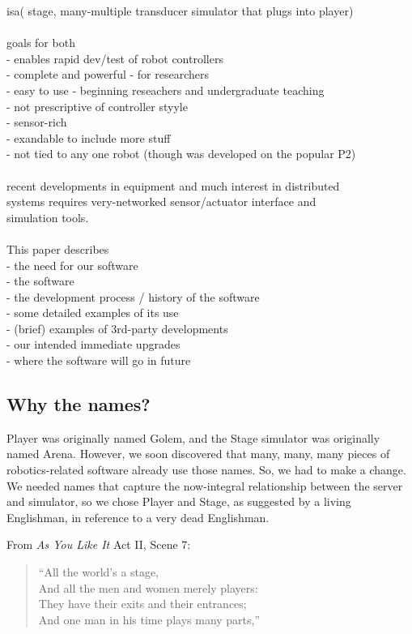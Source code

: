 \documentclass[]{article}
\begin{document}
isa( stage, many-multiple transducer simulator that plugs into player)\\
\\
goals for both \\
- enables rapid dev/test of robot controllers \\
- complete and powerful - for researchers\\
- easy to use - beginning reseachers and undergraduate teaching\\
- not prescriptive of controller styyle\\
- sensor-rich\\
- exandable to include more stuff\\
- not tied to any one robot (though was developed on the popular P2)\\
\\
recent developments in equipment and much interest in distributed\\
systems requires very-networked sensor/actuator interface and\\
simulation tools.\\
\\
This paper describes\\
- the need for our software\\
- the software\\
- the development process / history of the software\\
- some detailed examples of its use\\
- (brief) examples of 3rd-party developments\\
- our intended immediate upgrades\\
- where the software will go in future\\

\subsection{Why the names?}
Player was originally named Golem, and the Stage simulator was originally
named Arena.  However, we soon discovered that many,
many, many pieces of robotics-related software already use those names.
So, we had to make a change.  We needed names that capture the now-integral
relationship between the server and simulator, so we chose Player and
Stage, as suggested by a living Englishman, in reference to a
very dead Englishman.

\vspace*{1em}

From {\sl As You Like It} Act II, Scene 7:
\begin{quote}
  ``All the world's a stage, \\
  And all the men and women merely players: \\
  They have their exits and their entrances; \\
  And one man in his time plays many parts,''\\
\end{quote}
\end{document}
